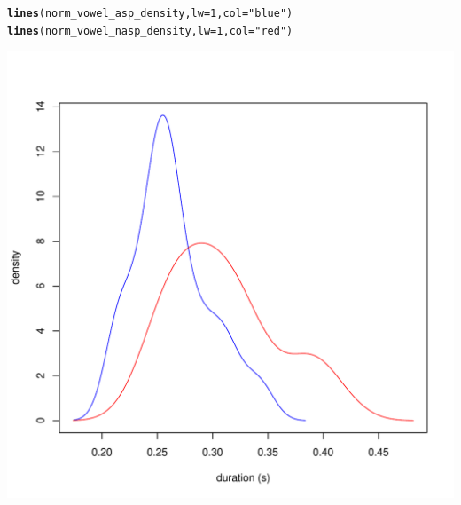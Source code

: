 \documentclass[a4paper,11pt]{article}\usepackage[]{graphicx}\usepackage[]{color}
\makeatletter
\def\maxwidth{ %
  \ifdim\Gin@nat@width>\linewidth
    \linewidth
  \else
    \Gin@nat@width
  \fi
}
\newcommand{\hlnum}[1]{\textcolor[rgb]{0.686,0.059,0.569}{#1}}%
\newcommand{\hlstr}[1]{\textcolor[rgb]{0.192,0.494,0.8}{#1}}%
\newcommand{\hlstd}[1]{\textcolor[rgb]{0.345,0.345,0.345}{#1}}%
\newcommand{\hlkwc}[1]{\textcolor[rgb]{0.333,0.667,0.333}{#1}}%
\newcommand{\hlkwd}[1]{\textcolor[rgb]{0.737,0.353,0.396}{\textbf{#1}}}%
\newenvironment{kframe}{%
 \def\at@end@of@kframe{}%
 \ifinner\ifhmode%
  \def\at@end@of@kframe{\end{minipage}}%
  \begin{minipage}{\columnwidth}%
 \fi\fi%
 \def\FrameCommand##1{\hskip\@totalleftmargin \hskip-\fboxsep
 \colorbox{shadecolor}{##1}\hskip-\fboxsep
     \hskip-\linewidth \hskip-\@totalleftmargin \hskip\columnwidth}%
 \MakeFramed {\advance\hsize-\width
   \@totalleftmargin\z@ \linewidth\hsize
   \@setminipage}}%
 {\par\unskip\endMakeFramed%
 \at@end@of@kframe}
\newenvironment{knitrout}{}{} %
\makeatother
\begin{document}
\begin{knitrout}
\begin{kframe}
\begin{alltt}
\hlkwd{lines}\hlstd{(norm_vowel_asp_density,} \hlkwc{lw} \hlstd{=} \hlnum{1}\hlstd{,} \hlkwc{col} \hlstd{=} \hlstr{"blue"}\hlstd{)}
\hlkwd{lines}\hlstd{(norm_vowel_nasp_density,} \hlkwc{lw} \hlstd{=} \hlnum{1}\hlstd{,} \hlkwc{col} \hlstd{=} \hlstr{"red"}\hlstd{)}
\end{alltt}
\end{kframe}
\includegraphics[width=\maxwidth]{img/mono-nas-dens-1} 

\end{knitrout}
\end{document}
